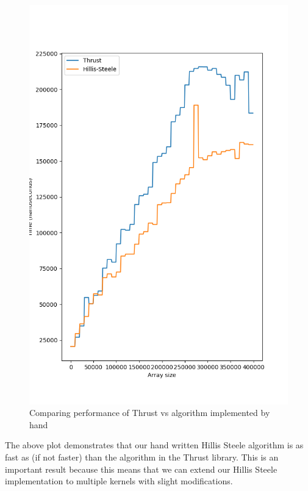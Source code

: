 \documentclass{article}
\begin{document}
\begin{figure}[H]
\hfill\includegraphics[scale=0.5]{Graphics/thrusthillis.png}\hspace*{\fill}
\caption{Comparing performance of Thrust vs algorithm implemented by hand}
\end{figure}
The above plot demonstrates that our hand written Hillis Steele algorithm is as fast as (if not faster) than the algorithm in the Thrust library. This is an important result because this means that we can extend our Hillis Steele implementation to multiple kernels with slight modifications.
\end{document}
